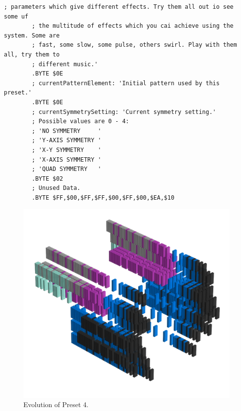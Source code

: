 \begin{lstlisting}[basicstyle=\ttfamily\tiny,caption=Source code for Preset 3.]
        ; parameters which give different effects. Try them all out io see some uf
        ; the multitude of effects which you cai achieve using the system. Some are
        ; fast, some slow, some pulse, others swirl. Play with them all, try them to
        ; different music.'
        .BYTE $0E
        ; currentPatternElement: 'Initial pattern used by this preset.'
        .BYTE $0E
        ; currentSymmetrySetting: 'Current symmetry setting.'
        ; Possible values are 0 - 4:
        ; 'NO SYMMETRY     '
        ; 'Y-AXIS SYMMETRY '
        ; 'X-Y SYMMETRY    '
        ; 'X-AXIS SYMMETRY '
        ; 'QUAD SYMMETRY   '
        .BYTE $02
        ; Unused Data.
        .BYTE $FF,$00,$FF,$FF,$00,$FF,$00,$EA,$10
\end{lstlisting}


\clearpage                                                                 
\begin{figure}[H]                                                          
    \centering                                                             
    \begin{adjustbox}{width=14cm,center}                                   
      \includegraphics[width=14cm]{src/presets/pattern4-45.png}%
    \end{adjustbox}                                                        
\caption{Evolution of Preset 4.}                                           
\end{figure}                                                               
\clearpage                                                                 
                                                                           
